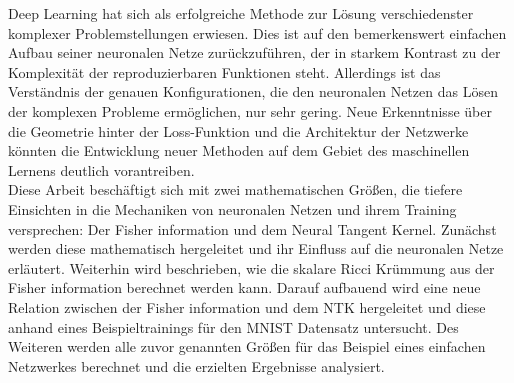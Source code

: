 Deep Learning hat sich als erfolgreiche Methode zur Lösung verschiedenster komplexer Problemstellungen erwiesen. Dies ist auf den bemerkenswert einfachen Aufbau seiner neuronalen Netze zurückzuführen, der in starkem Kontrast zu der Komplexität der reproduzierbaren Funktionen steht. Allerdings ist das Verständnis der genauen Konfigurationen, die den neuronalen Netzen das Lösen der komplexen Probleme ermöglichen, nur sehr gering. Neue Erkenntnisse über die Geometrie hinter der Loss-Funktion und die Architektur der Netzwerke könnten die Entwicklung neuer Methoden auf dem Gebiet des maschinellen Lernens deutlich vorantreiben.\\
Diese Arbeit beschäftigt sich mit zwei mathematischen Grö\ss en, die tiefere Einsichten in die Mechaniken von neuronalen Netzen und ihrem Training versprechen: Der Fisher information und dem Neural Tangent Kernel. Zunächst werden diese mathematisch hergeleitet und ihr Einfluss auf die neuronalen Netze erläutert. Weiterhin wird beschrieben, wie die skalare Ricci Krümmung aus der Fisher information berechnet werden kann. Darauf aufbauend wird eine neue Relation zwischen der Fisher information und dem NTK hergeleitet und diese anhand eines Beispieltrainings für den MNIST Datensatz untersucht. Des Weiteren werden alle zuvor genannten Grö\ss en für das Beispiel eines einfachen Netzwerkes berechnet und die erzielten Ergebnisse analysiert.